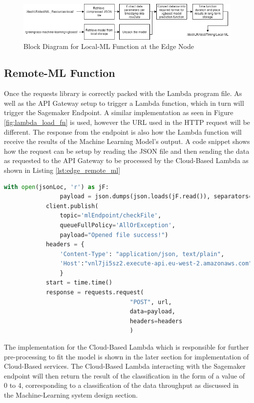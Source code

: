 \begin{figure}[ht]
    \centering
    \includegraphics[width=1\linewidth]{pages/Chapter4/Chapter 4 Images/LambdaFns/localml-fn.png}
    \caption{Block Diagram for Local-ML Function at the Edge Node}
    \label{fig:localml-function}
\end{figure}

\subsection{Remote-ML Function}
\label{remote-ml-fn}
Once the requests library is correctly packed with the Lambda program file. As well as the API Gateway setup to trigger a Lambda function, which in turn will trigger the Sagemaker Endpoint. A similar implementation as seen in Figure \ref{fig:lambda_load_fn} is used, however the URL used in the HTTP request will be different. The response from the endpoint is also how the Lambda function will receive the results of the Machine Learning Model's output. A code snippet shows how the request can be setup by reading the JSON file and then sending the data as requested to the API Gateway to be processed by the Cloud-Based Lambda as shown in Listing \ref{lst:edge_remote_ml}
\begin{lstlisting}[language=Python, caption={Sending Data to API Gateway to Invoke Cloud-Based Lambda for Sagemaker Endpoint}, label={lst:edge_remote_ml}]
with open(jsonLoc, 'r') as jF:
                payload = json.dumps(json.loads(jF.read()), separators=(',',':'))
            client.publish(
                topic='mlEndpoint/checkFile', 
                queueFullPolicy='AllOrException', 
                payload="Opened file success!")
            headers = {
                'Content-Type': "application/json, text/plain",
                'Host':"vnl7ji5sz2.execute-api.eu-west-2.amazonaws.com",
                }
            start = time.time()
            response = requests.request(
                                    "POST", url, 
                                    data=payload, 
                                    headers=headers
                                    )

\end{lstlisting}
The implementation for the Cloud-Based Lambda which is responsible for further pre-processing to fit the model is shown in the later section for implementation of Cloud-Based services. The Cloud-Based Lambda interacting with the Sagemaker endpoint will then return the result of the classification in the form of a value of 0 to 4, corresponding to a classification of the data throughput as discussed in the Machine-Learning system design section.


